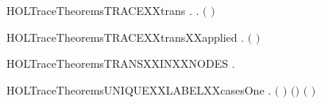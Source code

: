\newcommand{\HOLTraceTheoremsTRACEXXstrongind}{\UseVerbatim{HOLTraceTheoremsTRACEXXstrongind}}
\begin{SaveVerbatim}{HOLTraceTheoremsTRACEXXtrans}
\HOLTokenTurnstile{} \HOLSymConst{\HOLTokenForall{}}  .     \HOLSymConst{\HOLTokenImp{}} \HOLSymConst{\HOLTokenForall{}} .     \HOLSymConst{\HOLTokenImp{}}   \ensuremath{(} \HOLSymConst{++} \ensuremath{)} 
\end{SaveVerbatim}
\newcommand{\HOLTraceTheoremsTRACEXXtrans}{\UseVerbatim{HOLTraceTheoremsTRACEXXtrans}}
\begin{SaveVerbatim}{HOLTraceTheoremsTRACEXXtransXXapplied}
\HOLTokenTurnstile{} \HOLSymConst{\HOLTokenForall{}}    .
           \HOLSymConst{\HOLTokenConj{}}     \HOLSymConst{\HOLTokenImp{}}   \ensuremath{(} \HOLSymConst{++} \ensuremath{)} 
\end{SaveVerbatim}
\newcommand{\HOLTraceTheoremsTRACEXXtransXXapplied}{\UseVerbatim{HOLTraceTheoremsTRACEXXtransXXapplied}}
\begin{SaveVerbatim}{HOLTraceTheoremsTRANSXXINXXNODES}
\HOLTokenTurnstile{} \HOLSymConst{\HOLTokenForall{}}  .  \HOLTokenTransBegin{}\HOLTokenTransEnd {} \HOLSymConst{\HOLTokenImp{}}  \HOLConst{\HOLTokenIn{}}  
\end{SaveVerbatim}
\newcommand{\HOLTraceTheoremsTRANSXXINXXNODES}{\UseVerbatim{HOLTraceTheoremsTRANSXXINXXNODES}}
\begin{SaveVerbatim}{HOLTraceTheoremsUNIQUEXXLABELXXcasesOne}
\HOLTokenTurnstile{} \HOLSymConst{\HOLTokenForall{}} .
        \ensuremath{(} \ensuremath{)} \ensuremath{(}\HOLConst{\ensuremath{\tau}}\HOLSymConst{::}\ensuremath{)} \HOLSymConst{\HOLTokenEquiv{}}
        \ensuremath{(} \ensuremath{)} 
\end{SaveVerbatim}
